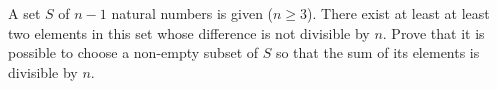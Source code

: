 A set $S$ of $n-1$ natural numbers is given ($n\ge 3$). There exist at least at least two elements in this set whose difference is not divisible by $n$. Prove that it is possible to choose a non-empty subset of $S$ so that the sum of its elements is divisible by $n$.